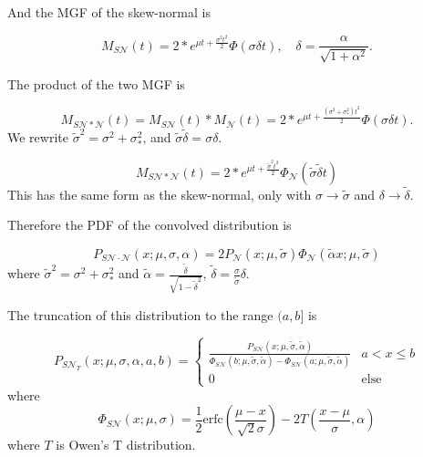 \documentclass[twocolumn]{aastex631}
\newcommand{\mcal}[1]{\mathcal{#1}}
\newcommand{\pdf}{P}
\newcommand{\cdf}{\Phi}
\newcommand{\Exp}[1]{e^{#1}}
\begin{document}
        And the MGF of the skew-normal is

        \begin{equation} \label{eq:mgf_skewnormal}
            M_{S\mcal{N}}(t) = 2 * \Exp{\mu t + \frac{\sigma^2 t^2}{2}} \cdf(\sigma \delta t), \quad \delta = \frac{\alpha}{\sqrt{1 + \alpha^2}}.
        \end{equation}

        The product of the two MGF is

        \begin{equation}
            M_{S\mcal{N}*\mcal{N}}(t) = M_{S\mcal{N}}(t) * M_{\mcal{N}}(t) = 2 * \Exp{\mu t + \frac{(\sigma^2 + \sigma_*^2) t^2}{2}} \cdf(\sigma \delta t).
        \end{equation}
        We rewrite $\tilde\sigma^2 = \sigma^2 + \sigma_*^2$, and $\tilde{\sigma} \tilde{\delta} = \sigma \delta$.

        \begin{equation}
            M_{S\mcal{N}*\mcal{N}}(t) = 2 * \Exp{\mu t + \frac{\tilde{\sigma}^2 t^2}{2}} \cdf_{\mcal{N}}(\tilde{\sigma} \tilde{\delta} t)
        \end{equation}
        This has the same form as the skew-normal, only with $\sigma \rightarrow \tilde\sigma$ and $\delta \rightarrow \tilde\delta$.

        Therefore the PDF of the convolved distribution is 

        \begin{equation}
            \pdf_{S\mcal{N}\cdot\mcal{N}}(x;\mu,\sigma,\alpha) = 2\pdf_{\mcal{N}}(x;\mu,\tilde{\sigma})\cdf_{\mcal{N}}(\tilde{\alpha} x;\mu,\tilde{\sigma})
        \end{equation}
        where $\tilde\sigma^2 = \sigma^2 + \sigma_*^2$ and $\tilde{\alpha} = \frac{\tilde{\delta}}{\sqrt{1-\tilde{\delta}^2}}$, $\tilde{\delta} = \frac{\sigma}{\tilde{\sigma}}\delta$.

        The truncation of this distribution to the range $(a, b]$ is

       \begin{equation}
            \pdf_{S\mcal{N}_T}(x; \mu, \sigma, \alpha, a, b)
                = \begin{cases}
                    \frac{\pdf_{S\mcal{N}}(x; \mu, \tilde\sigma, \tilde\alpha)}{\cdf_{S\mcal{N}}(b; \mu, \tilde\sigma, \tilde\alpha) - \cdf_{S\mcal{N}}(a; \mu, \tilde\sigma, \tilde\alpha)} & a < x \leq b \\
                    0 & \text{else}
                \end{cases}
        \end{equation}
        where
        \begin{equation}
            \cdf_{S\mcal{N}}(x; \mu, \sigma) = \frac{1}{2} \text{erfc}\left(\frac{\mu -x}{\sqrt{2} \sigma }\right)-2 T\left(\frac{x-\mu }{\sigma },\alpha \right)
        \end{equation}
        where $T$ is Owen's T distribution.
\end{document}
